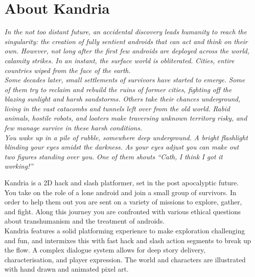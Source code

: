 \section{About Kandria}
\begin{mdframed}[
  roundcorner=5pt,
  backgroundcolor=black!5,
  linewidth=0,
  innertopmargin=+0.5cm,
  innerrightmargin=+0.5cm,
  innerbottommargin=+0.5cm,
  innerleftmargin=+0.5cm]
  \itshape\color{black!90}
  In the not too distant future, an accidental discovery leads humanity to reach the singularity: the creation of fully sentient androids that can act and think on their own. However, not long after the first few androids are deployed across the world, calamity strikes. In an instant, the surface world is obliterated. Cities, entire countries wiped from the face of the earth. \\

  Some decades later, small settlements of survivors have started to emerge. Some of them try to reclaim and rebuild the ruins of former cities, fighting off the blazing sunlight and harsh sandstorms. Others take their chances underground, living in the vast catacombs and tunnels left over from the old world. Rabid animals, hostile robots, and looters make traversing unknown territory risky, and few manage survive in these harsh conditions. \\

  You wake up in a pile of rubble, somewhere deep underground. A bright flashlight blinding your eyes amidst the darkness. As your eyes adjust you can make out two figures standing over you. One of them shouts ``Cath, I think I got it working!''
\end{mdframed}
\vskip1cm

Kandria is a 2D hack and slash platformer, set in the post apocalyptic future. You take on the role of a lone android and join a small group of survivors. In order to help them out you are sent on a variety of missions to explore, gather, and fight. Along this journey you are confronted with various ethical questions about transhumanism and the treatment of androids. \\

Kandria features a solid platforming experience to make exploration challenging and fun, and intermixes this with fast hack and slash action segments to break up the flow. A complex dialogue system allows for deep story delivery, characterisation, and player expression. The world and characters are illustrated with hand drawn and animated pixel art. \\

